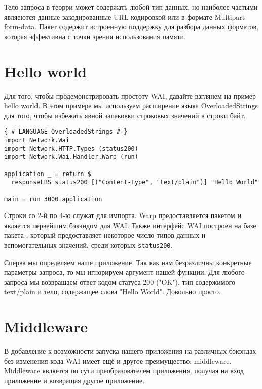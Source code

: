 Тело запроса в теорри может содержать любой тип данных, но наиболее частыми являеются данные
закодированные URL-кодировкой или в формате Multipart form-data. Пакет
 содержит встроенную
поддержку для разбора данных форматов, которая эффективна с точки зрения использования памяти.

\section{Hello world}

Для того, чтобы продемонстрировать простоту WAI, давайте взглянем на пример hello world.
В этом примере мы используем расширение языка OverloadedStrings для того, чтобы избежать
явной запаковки строковых значений в строки байт.

\begin{lstlisting}
{-# LANGUAGE OverloadedStrings #-}
import Network.Wai
import Network.HTTP.Types (status200)
import Network.Wai.Handler.Warp (run)

application _ = return $
  responseLBS status200 [("Content-Type", "text/plain")] "Hello World"

main = run 3000 application
\end{lstlisting}%

Строки со 2-й по 4-ю служат для импорта. Warp предоставляется пакетом
 и является первейшим бэкэндом
для WAI. Также интерфейс WAI построен на базе пакета
, который
предоставляет некоторое число типов данных и вспомогательных значений,
среди которых \lstinline!status200!.

Сперва мы определяем наше приложение. Так как нам безразличны конкретные параметры
запроса, то мы игнорируем аргумент нашей функции. Для любого запроса мы возвращаем
ответ кодом статуса 200 ("OK"), тип содержимого text/plain и тело, содержащее
слова "Hello World". Довольно просто.

\section {Middleware}

В добавление к возможности запуска нашего приложения на различных бэкэндах без изменения
кода WAI имеет ещё и другое преимущество: middleware. Middleware является по сути
преобразователем приложения, получая на вход приложение и возвращая другое приложение.

